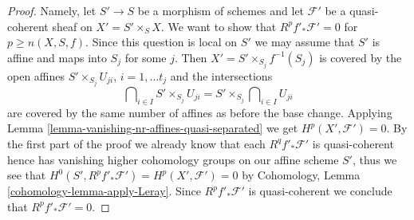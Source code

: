 \begin{proof}
\medskip\noindent
Namely, let $S' \to S$ be a morphism of schemes and let
$\mathcal{F}'$ be a quasi-coherent sheaf on $X' = S' \times_S X$.
We want to show that $R^pf'_*\mathcal{F}' = 0$ for $p \geq n(X, S, f)$.
Since this question is local on $S'$ we may assume that $S'$ is affine
and maps into $S_j$ for some $j$. Then $X' = S' \times_{S_j} f^{-1}(S_j)$
is covered by the open affines $S' \times_{S_j} U_{ji}$, $i = 1, \ldots t_j$
and the intersections
$$
\bigcap\nolimits_{i \in I} S' \times_{S_j} U_{ji} =
S' \times_{S_j} \bigcap\nolimits_{i \in I} U_{ji}
$$
are covered by the same number of affines as before the base change.
Applying
Lemma \ref{lemma-vanishing-nr-affines-quasi-separated}
we get $H^p(X', \mathcal{F}') = 0$. By the first part of the proof
we already know that each $R^qf'_*\mathcal{F}'$ is quasi-coherent
hence has vanishing higher cohomology groups on our affine scheme $S'$,
thus we see that $H^0(S', R^pf'_*\mathcal{F}') = H^p(X', \mathcal{F}') = 0$
by Cohomology, Lemma \ref{cohomology-lemma-apply-Leray}.
Since $R^pf'_*\mathcal{F}'$ is quasi-coherent
we conclude that $R^pf'_*\mathcal{F}' = 0$.
\end{proof}